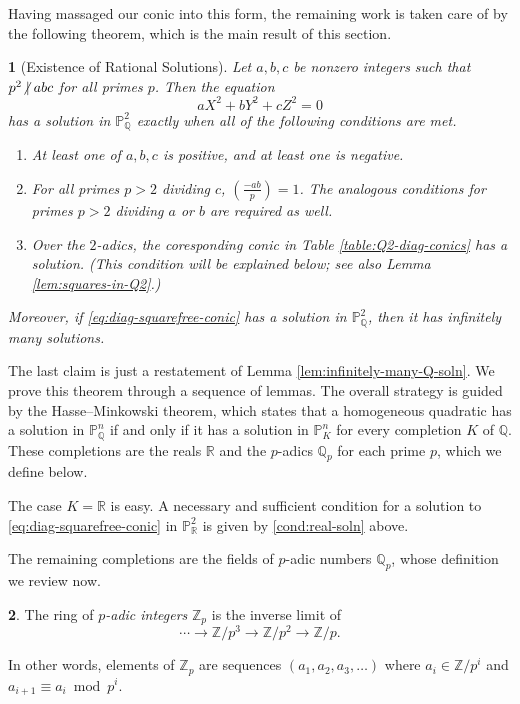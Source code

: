 \documentclass[10pt,a4paper]{amsart}
\numberwithin{equation}{section}
\numberwithin{figure}{section}
\numberwithin{table}{section}
\theoremstyle{definition}
\theoremstyle{plain}
\newtheorem{thm}{\protect\theoremname}[section]
\theoremstyle{remark}
\theoremstyle{plain}
\theoremstyle{definition}
\newtheorem{defn}[thm]{\protect\definitionname}
\theoremstyle{plain}
\theoremstyle{plain}
\providecommand{\definitionname}{Definition}
\providecommand{\theoremname}{Theorem}
\newcommand{\legendre}[2]{\genfrac{(}{)}{}{}{#1}{#2}}
\renewcommand{\P}{\mathbb{P}}
\newcommand{\Z}{\mathbb{Z}}
\newcommand{\Q}{\mathbb{Q}}
\newcommand{\R}{\mathbb{R}}
\newcommand{\ndiv}{\centernot|}
\begin{document}
	Having massaged our conic into this form, the remaining work is taken care of by the following theorem, which is the main result of this section.
	\begin{thm}[Existence of Rational Solutions]\label{thm:rational-solutions}
		Let $a,b,c$ be nonzero integers such that $p^2 \ndiv abc$ for all primes $p$. Then the equation
		\begin{equation}\label{eq:diag-squarefree-conic}
		aX^2 + bY^2 + cZ^2 = 0
		\end{equation}
		has a solution in $\P^2_\Q$ exactly when all of the following conditions are met.
		\begin{enumerate}
			\item\label{cond:real-soln} At least one of $a,b,c$ is positive, and at least one is negative.
			\item\label{cond:Qp-soln} For all primes $p>2$ dividing $c$, $\legendre{-ab}{p} = 1$. The analogous conditions for primes $p>2$ dividing $a$ or $b$ are required as well.
			\item\label{cond:Q2-soln} Over the $2$-adics, the coresponding conic in Table \ref{table:Q2-diag-conics} has a solution. (This condition will be explained below; see also Lemma 
			\ref{lem:squares-in-Q2}.)
		\end{enumerate}
		Moreover, if \eqref{eq:diag-squarefree-conic} has a solution in $\P^2_\Q$, then it has infinitely many solutions.
	\end{thm}
	The last claim is just a restatement of Lemma \ref{lem:infinitely-many-Q-soln}.
	We prove this theorem through a sequence of lemmas. The overall strategy is guided by the Hasse--Minkowski theorem, which states that a homogeneous quadratic has a solution in $\P^n_\Q$ if and only if it has a solution in $\P^n_K$ for every completion $K$ of $\Q$. These completions are the reals $\R$ and the $p$-adics $\Q_p$ for each prime $p$, which we define below.
	
	The case $K=\R$ is easy. A necessary and sufficient condition for a solution 
	to \eqref{eq:diag-squarefree-conic} in $\P^2_\R$ is given by 
	\eqref{cond:real-soln} above.
	
	The remaining completions are the fields of $p$-adic numbers $\Q_p$, whose definition 
	we review now.
	\begin{defn}
		The ring of \emph{$p$-adic integers} $\Z_p$ is the inverse limit of
		\[
		\cdots \to \Z/p^3 \to \Z/p^2 \to \Z/p.
		\]
	\end{defn}
	In other words, elements of $\Z_p$ are sequences $(a_1,a_2,a_3,\ldots)$ where $a_i \in \Z/p^i$ and $a_{i+1} \equiv a_i\bmod {p^i}$.
	
\end{document}
